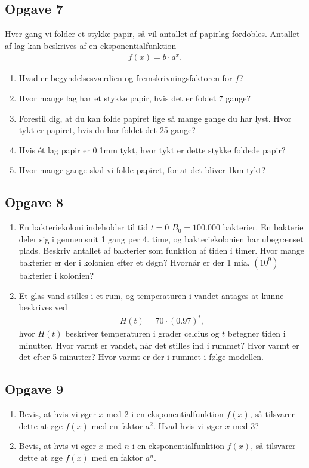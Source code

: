 \subsection*{Opgave 7}
Hver gang vi folder et stykke papir, så vil antallet af papirlag fordobles. Antallet af lag kan beskrives af en eksponentialfunktion 
\begin{align*}
	f(x) = b\cdot a^x.
\end{align*}
\begin{enumerate}[label=\roman*)]
	\item Hvad er begyndelsesværdien og fremskrivningsfaktoren for $f$?
	\item Hvor mange lag har et stykke papir, hvis det er foldet 7 gange?
	\item Forestil dig, at du kan folde papiret lige så mange gange du har lyst. Hvor tykt er
	papiret, hvis du har foldet det 25 gange?
 	\item Hvis ét lag papir er 0.1mm tykt, hvor tykt er dette stykke foldede papir?
	\item Hvor mange gange skal vi folde papiret, for at det bliver 1km tykt?
\end{enumerate}


\subsection*{Opgave 8}
\begin{enumerate}[label=\roman*)]
\item En bakteriekoloni indeholder til tid $t=0$ $B_0 = 100.000$ bakterier. En bakterie deler sig i gennemsnit 1 gang per 4. time, og bakteriekolonien har ubegrænset plads. Beskriv antallet af bakterier som funktion af tiden i timer. Hvor mange bakterier er der i kolonien efter et døgn? Hvornår er der 1 mia. $(10^9)$ bakterier i kolonien?
\item Et glas vand stilles i et rum, og temperaturen i vandet antages at kunne beskrives ved
\begin{align*}
H(t) = 70\cdot(0.97)^t,
\end{align*}
hvor $H(t)$ beskriver temperaturen i grader celcius og $t$ betegner tiden i minutter. Hvor varmt er vandet, når det stilles ind i rummet? Hvor varmt er det efter 5 minutter? Hvor varmt er der i rummet i følge modellen. 
\end{enumerate}

\subsection*{Opgave 9}
\begin{enumerate}[label=\roman*)]
\item Bevis, at hvis vi øger $x$ med 2 i en eksponentialfunktion $f(x)$, så tilsvarer dette at øge $f(x)$ med en faktor $a^2$. Hvad hvis vi øger $x$ med $3$?
\item Bevis, at hvis vi øger $x$ med $n$ i en eksponentialfunktion $f(x)$, så tilsvarer dette at øge $f(x)$ med en faktor $a^n$.
\end{enumerate}
